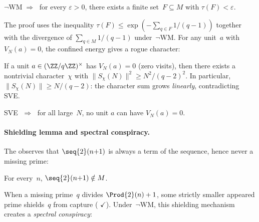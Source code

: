 \begin{theorem}
\label{thm:tube-collapse}
$\neg\mathrm{WM} \;\Longrightarrow\;$ for every $\varepsilon > 0$, there
exists a finite set~$F \subseteq M$ with $\tau(F) < \varepsilon$.
\end{theorem}

\noindent
The proof uses the inequality
$\tau(F) \leq \exp(-\sum_{q \in F} 1/(q{-}1))$
together with the divergence of $\sum_{q \in M} 1/(q{-}1)$ under~$\neg$WM\@.
For any unit~$a$ with $V_N(a) = 0$, the confined energy gives a rogue
character:

\begin{theorem}
\label{thm:rogue-character}
If a unit $a \in (\ZZ/q\ZZ)^\times$ has $V_N(a) = 0$ (zero visits), then
there exists a nontrivial character~$\chi$ with
$\lVert S_\chi(N) \rVert^2 \geq N^2 / (q{-}2)^2$.
In particular, $\lVert S_\chi(N) \rVert \geq N/(q{-}2)$: the
character sum grows \emph{linearly}, contradicting SVE\@.
\end{theorem}

\begin{theorem}
\label{thm:sve-contradicts-avoidance}
SVE $\;\Longrightarrow\;$ for all large~$N$, no unit $a$ can have
$V_N(a) = 0$.
\end{theorem}

\paragraph{Shielding lemma and spectral conspiracy.}
The  observes that $\seq{2}(n{+}1)$ is always
a term of the sequence, hence never a missing prime:

\begin{theorem}
\label{thm:shielding}
For every~$n$, $\seq{2}(n{+}1) \notin M$.
\end{theorem}

\noindent
When a missing prime~$q$ divides $\Prod{2}(n)+1$, some strictly smaller
appeared prime shields~$q$ from capture
(
{\color{leanink}$\checkmark$}).
Under~$\neg$WM, this shielding mechanism creates a \emph{spectral conspiracy}:

